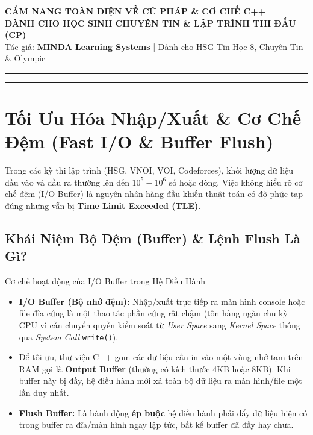 \documentclass[11pt,a4paper]{article}
\begin{document}
\begin{center}
    {\LARGE \textbf{\textsf{CẨM NANG TOÀN DIỆN VỀ CÚ PHÁP \& CƠ CHẾ C++}}}\\[4pt]
    {\Large \textbf{\textsf{DÀNH CHO HỌC SINH CHUYÊN TIN \& LẬP TRÌNH THI ĐẤU (CP)}}}\\[8pt]
    {\normalsize \textsf{Tác giả: \textbf{MINDA Learning Systems} | Dành cho HSG Tin Học 8, Chuyên Tin \& Olympic}}\\[12pt]
    \rule{\linewidth}{1pt}
\end{center}

\tableofcontents
\vspace{10pt}
\rule{\linewidth}{0.5pt}
\vspace{15pt}

\section{Tối Ưu Hóa Nhập/Xuất \& Cơ Chế Đệm (Fast I/O \& Buffer Flush)}

Trong các kỳ thi lập trình (HSG, VNOI, VOI, Codeforces), khối lượng dữ liệu đầu vào và đầu ra thường lên đến $10^5 - 10^6$ số hoặc dòng. Việc không hiểu rõ cơ chế đệm (I/O Buffer) là nguyên nhân hàng đầu khiến thuật toán có độ phức tạp đúng nhưng vẫn bị \textbf{Time Limit Exceeded (TLE)}.

\subsection{Khái Niệm Bộ Đệm (Buffer) \& Lệnh Flush Là Gì?}

\begin{conceptbox}{Cơ chế hoạt động của I/O Buffer trong Hệ Điều Hành}
    \begin{itemize}[leftmargin=*]
        \item \textbf{I/O Buffer (Bộ nhớ đệm):} Nhập/xuất trực tiếp ra màn hình console hoặc file đĩa cứng là một thao tác phần cứng rất chậm (tốn hàng ngàn chu kỳ CPU vì cần chuyển quyền kiểm soát từ \textit{User Space} sang \textit{Kernel Space} thông qua \textit{System Call} \texttt{write()}).
        \item Để tối ưu, thư viện C++ gom các dữ liệu cần in vào một vùng nhớ tạm trên RAM gọi là \textbf{Output Buffer} (thường có kích thước 4KB hoặc 8KB). Khi buffer này bị đầy, hệ điều hành mới xả toàn bộ dữ liệu ra màn hình/file một lần duy nhất.
        \item \textbf{Flush Buffer:} Là hành động \textbf{ép buộc} hệ điều hành phải đẩy dữ liệu hiện có trong buffer ra đĩa/màn hình ngay lập tức, bất kể buffer đã đầy hay chưa.
    \end{itemize}
\end{conceptbox}
\end{document}
